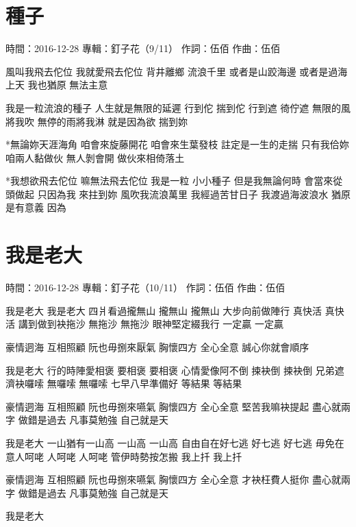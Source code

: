 \documentclass[UTF8,a4paper,oneside,twocolumn,12pt]{ctexbook}
\newcommand{\infopair}[2]{\textbullet #1：#2}
\newcommand{\zc}[1][伍佰]{\infopair{作詞}{#1}}
\newcommand{\zq}[1][伍佰]{\infopair{作曲}{#1}}
\newcommand{\zj}[1]{\infopair{專輯}{#1}}
\newcommand{\sj}[1]{\infopair{時間}{#1}}
\newenvironment{info}{\begin{flushleft}\kaishu
	}
	{\end{flushleft}\normalsize\yahei\par}
\newenvironment{lyric}{
	}
{}
\begin{document}
\section{種子}
\begin{info}
	\sj{2016-12-28}
	\zj{釘子花（9/11）}
	\zc
	\zq
\end{info}
\begin{lyric}
	風叫我飛去佗位 我就愛飛去佗位
	背井離鄉 流浪千里
	或者是山跤海邊 或者是過海上天
	我也猶原 無法主意

	我是一粒流浪的種子 人生就是無限的延遲
	行到佗 揣到佗 行到遮 徛佇遮
	無限的風將我吹 無停的雨將我淋
	就是因為欲 揣到妳

	*無論妳天涯海角
	咱會來旋藤開花 咱會來生葉發枝
	註定是一生的走揣
	只有我佮妳 咱兩人黏做伙 無人剝會開
	做伙來相倚落土

	*我想欲飛去佗位 嘛無法飛去佗位
	我是一粒 小小種子
	但是我無論何時 會當來從頭做起
	只因為我 來拄到妳
	風吹我流浪萬里
	我經過苦甘日子 我渡過海波浪水
	猶原是有意義 因為
\end{lyric}

\section{我是老大}
\begin{info}
	\sj{2016-12-28}
	\zj{釘子花（10/11）}
	\zc
	\zq
\end{info}
\begin{lyric}
	我是老大 我是老大
	四爿看過攏無山 攏無山 攏無山
	大步向前做陣行 真快活 真快活
	講到做到袂拖沙 無拖沙 無拖沙
	眼神堅定綴我行 一定贏 一定贏

	豪情迵海 互相照顧
	阮也毋捌來厭氣
	胸懷四方 全心全意
	誠心你就會順序

	我是老大
	行的時陣愛相褒 要相褒 要相褒
	心情愛像阿不倒 捒袂倒 捒袂倒
	兄弟遮濟袂囉嗦 無囉嗦 無囉嗦
	七早八早準備好 等結果 等結果

	豪情迵海 互相照顧
	阮也毋捌來嚥氣
	胸懷四方 全心全意
	堅苦我嘛袂提起
	盡心就兩字 做錯是過去
	凡事莫勉強 自己就是天

	我是老大
	一山猶有一山高 一山高 一山高
	自由自在好七逃 好七逃 好七逃
	毋免在意人呵咾 人呵咾 人呵咾
	管伊時勢按怎搬 我上扦 我上扦

	豪情迵海 互相照顧
	阮也毋捌來嚥氣
	胸懷四方 全心全意
	才袂枉費人挺你
	盡心就兩字 做錯是過去
	凡事莫勉強 自己就是天

	我是老大
\end{lyric}
\end{document}
